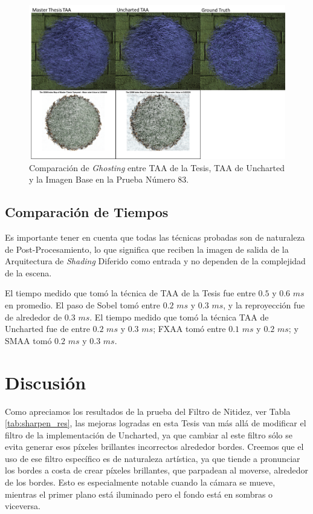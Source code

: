 \documentclass[pregrado]{tesis-usb} %
\begin{document}
\begin{figure}[!htb]
	\centering
	\includegraphics[scale=0.8]{images/results/hairball_ghosting_lighted.png}
	\caption{Comparación de \textit{Ghosting} entre TAA de la Tesis, TAA de Uncharted y la Imagen Base en la Prueba Número 83.}\label{fig:hairball_ghosting_lighted}
\end{figure}

\FloatBarrier
\subsection{Comparación de Tiempos} \label{result_timing}
Es importante tener en cuenta que todas las técnicas probadas son de naturaleza de Post-Procesamiento, lo que significa que reciben la imagen de salida de la Arquitectura de \textit{Shading} Diferido como entrada y no dependen de la complejidad de la escena.

El tiempo medido que tomó la técnica de TAA de la Tesis fue entre $0.5$ y $0.6$ $ms$ en promedio. El paso de Sobel tomó entre $0.2$ $ms$ y $0.3$ $ms$, y la reproyección fue de alrededor de $0.3$ $ms$. El tiempo medido que tomó la técnica TAA de Uncharted fue de entre $0.2$ $ms$ y $0.3$ $ms$; FXAA tomó entre $0.1$ $ms$ y $0.2$ $ms$; y SMAA tomó $0.2$ $ms$ y $0.3$ $ms$.


\section{Discusión}
Como apreciamos los resultados de la prueba del Filtro de Nitidez, ver Tabla \ref{tab:sharpen_res}, las mejoras logradas en esta Tesis van más allá de modificar el filtro de la implementación de Uncharted, ya que cambiar al este filtro sólo se evita generar esos píxeles brillantes incorrectos alrededor bordes. Creemos que el uso de ese filtro específico es de naturaleza artística, ya que tiende a pronunciar los bordes a costa de crear píxeles brillantes, que parpadean al moverse, alrededor de los bordes. Esto es especialmente notable cuando la cámara se mueve, mientras el primer plano está iluminado pero el fondo está en sombras o viceversa.
\end{document}
